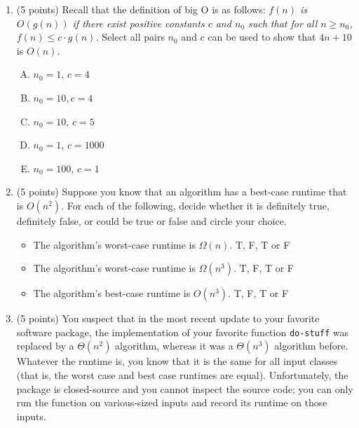 \documentclass[11pt]{article}
\begin{document}
\begin{enumerate}
\begin{enumerate}[A.]
    \item $n$
    \item $\log n$
    \item $n^2$
    \item $n^3$
    \item $n!$
\end{enumerate}

\item (5 points) Recall that the definition of big O is as follows:
\emph{$f(n)$ is $O(g(n))$ if there exist positive constants $c$ and $n_0$ such
that for all $n \geq n_0$, $f(n) \leq c \cdot g(n)$.} Select all pairs $n_0$ and $c$ can be
used to show that $4n + 10$ is $O(n)$.
\begin{enumerate}[A.]
    \item $n_0 = 1$, $c = 4$
    \item $n_0=10, c = 4$
    \item $n_0 = 10$, $c = 5$
    \item $n_0 = 1$, $c = 1000$
    \item $n_0 = 100$, $c = 1$

\end{enumerate}

\item
(5 points)
Suppose you know that an algorithm has a best-case runtime that is $O(n^2)$. For each of the following, decide whether it is definitely true, definitely false, or could be true or false and circle your choice. 

\begin{itemize}
    \item The algorithm's worst-case runtime is $\Omega(n)$. T, F, T or F
    \item The algorithm's worst-case runtime is $\Omega(n^3)$. T, F, T or F
    \item The algorithm's best-case runtime is $O(n^3)$. T, F, T or F
\end{itemize}
\newpage


\item (5 points)
You suspect that in the most recent update to your favorite software package,
the implementation of your favorite function \texttt{do-stuff} was replaced by a $\Theta(n^2)$ 
algorithm, whereas it was a $\Theta(n^3)$ algorithm before. Whatever the runtime is, you know that
it is the same for all input classes (that is, the worst case and best case runtimes are equal).
Unfortunately, the package is
closed-source and you cannot inspect the source code; you can only run the function on
various-sized inputs and record its runtime on those inputs.


\end{enumerate}
\end{document}
